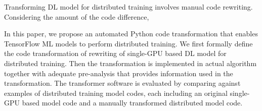 Transforming DL model for distributed training involves manual code rewriting.
Considering the amount of the code difference,  

In this paper, we propose an automated Python code transformation that enables
TensorFlow ML models to perform distributed training.
We first formally define the code transformation of rewriting of
single-GPU based DL model for distributed training.
Then the transformation is implemented in actual algorithm together with
adequate pre-analysis that provides information used in the transformation.
The transformer software is evaluated by comparing against 
examples of distributed training model codes, 
each including an original single-GPU based model code 
and a manually transformed distributed model code.

